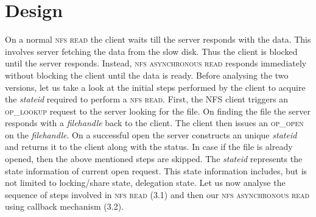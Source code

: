 \section{Design}

\label{Design}
On a normal \textsc{nfs read} the client waits till the server responds with the data. This involves server fetching the data from the slow disk. Thus the client is blocked until the server responds. Instead, \textsc{nfs asynchronous read} responds immediately without blocking the client until the data is ready. Before analysing the two versions, let us take a look at the initial steps performed by the client to acquire the \textit{stateid} required to perform a \textsc{nfs read}. First, the NFS client triggers an \textsc{op\_lookup} request to the server looking for the file. On finding the file the server responds with a \textit{filehandle} back to the client. The client then issues an \textsc{op\_open} on the \textit{filehandle}. On a successful open the server constructs an unique \textit{stateid} and returns it to the client along with the status. In case if the file is already opened,    then the above mentioned steps are skipped. The \textit{stateid} represents the state information of current open request. This state information includes, but is not limited to locking/share state, delegation state. Let us now analyse the sequence of steps involved in \textsc{nfs read} (3.1) and then our \textsc{nfs asynchronous read} using callback mechanism (3.2).

